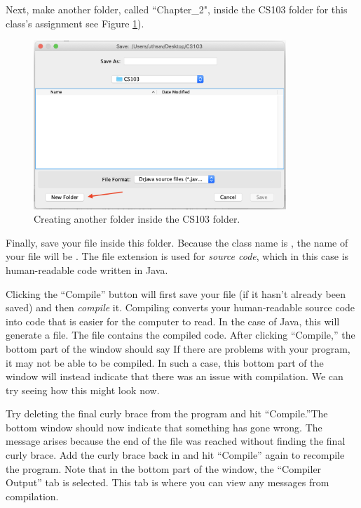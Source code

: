 Next, make another folder, called ``Chapter\_2", inside the CS103 folder for this class's assignment see Figure \ref{fig:helloworld:sec:saving2}).

\begin{figure}[ht]
	\centering
	\includegraphics[width=0.85\textwidth]{images/hello_world_saving2}
	\caption{Creating another folder inside the CS103 folder.}
	\label{fig:helloworld:sec:saving2}
\end{figure}

Finally, save your file inside this folder. Because the class name is , the name of your file will be
. The  file extension is used for
\emph{source code}, which in this case is human-readable code written in Java.

Clicking the ``Compile'' button will first save your file (if it hasn't already been saved) and then \emph{compile} it. Compiling converts your human-readable
source code into code that is easier for the computer to read.
In the case of Java, this will generate a  file. The
 file contains the compiled code.
After clicking ``Compile,'' the bottom part of the window should say
 If there are problems with your program, it may not be able to be compiled. In such a case, this bottom part of the window will instead indicate that there was an issue with compilation.
We can try seeing how this might look now.

Try deleting the final curly brace \ic{\}} from the program and hit ``Compile.''The bottom window should now indicate that something has gone wrong.
The message  arises because
the end of the file was reached without finding the final curly brace.
Add the curly brace back in and hit ``Compile'' again to recompile the program.
Note that in the bottom part of the window, the ``Compiler Output'' tab is selected. This tab is where you can view any messages from compilation.

